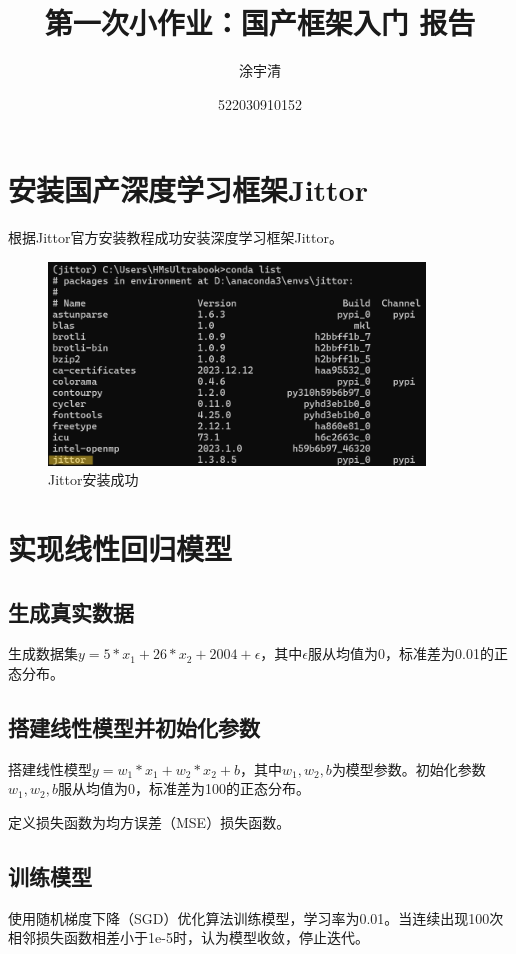 \documentclass[UTF8,a4paper,12pt]{ctexart}
\title{\textbf{\Large{第一次小作业：国产框架入门 报告}}}
\author{涂宇清}
\date{522030910152}
\begin{document}
 
\maketitle
\setcounter{page}{1}        %
 
 
\section{安装国产深度学习框架Jittor}
根据Jittor官方安装教程成功安装深度学习框架Jittor。

\begin{figure}[H]   %
\centering
 \includegraphics[width=10cm]{picture1.png}
 \caption{Jittor安装成功}
\end{figure}
 
\section{实现线性回归模型}
\subsection{生成真实数据}
生成数据集$y = 5 * x_1 + 26 * x_2 + 2004 + \epsilon$，其中$\epsilon$服从均值为0，标准差为0.01的正态分布。
\subsection{搭建线性模型并初始化参数}
搭建线性模型$y = w_1 * x_1 + w_2 * x_2 + b$，其中$w_1, w_2, b$为模型参数。初始化参数$w_1, w_2, b$服从均值为0，标准差为100的正态分布。

定义损失函数为均方误差（MSE）损失函数。
\subsection{训练模型}
使用随机梯度下降（SGD）优化算法训练模型，学习率为0.01。当连续出现100次相邻损失函数相差小于1e-5时，认为模型收敛，停止迭代。
\end{document}
